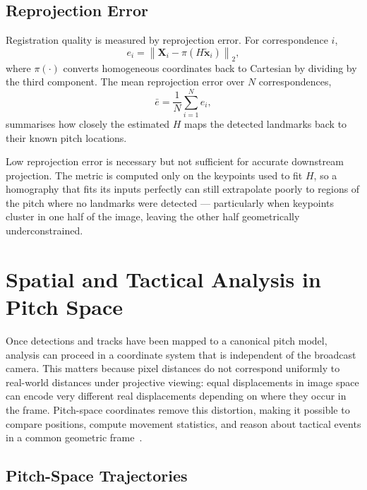 \subsection{Reprojection Error}
\label{subsec:background_reprojection}

Registration quality is measured by reprojection error. 
For correspondence \(i\),
\begin{equation}
    e_i =
    \left\lVert
    \mathbf{X}_i - \pi(H\tilde{\mathbf{x}}_i)
    \right\rVert_2,
    \label{eq:reprojection_error}
\end{equation}
where \(\pi(\cdot)\) converts homogeneous coordinates back 
to Cartesian by dividing by the third component. The mean 
reprojection error over \(N\) correspondences,
\begin{equation}
    \bar{e} = \frac{1}{N} \sum_{i=1}^{N} e_i,
    \label{eq:mean_reprojection_error}
\end{equation}
summarises how closely the estimated \(H\) maps the 
detected landmarks back to their known pitch locations.

Low reprojection error is necessary but not sufficient for 
accurate downstream projection. The metric is computed 
only on the keypoints used to fit \(H\), so a homography 
that fits its inputs perfectly can still extrapolate poorly 
to regions of the pitch where no landmarks were detected — 
particularly when keypoints cluster in one half of the 
image, leaving the other half geometrically 
underconstrained.

\section{Spatial and Tactical Analysis in Pitch Space}
\label{sec:background_spatial_analytics}

Once detections and tracks have been mapped to a canonical 
pitch model, analysis can proceed in a coordinate system 
that is independent of the broadcast camera. This matters 
because pixel distances do not correspond uniformly to 
real-world distances under projective viewing: equal 
displacements in image space can encode very different 
real displacements depending on where they occur in the 
frame. Pitch-space coordinates remove this distortion, 
making it possible to compare positions, compute movement 
statistics, and reason about tactical events in a common 
geometric frame~\cite{Theiner2022,Goes2021}.

\subsection{Pitch-Space Trajectories}
\label{subsec:background_player_projection}

